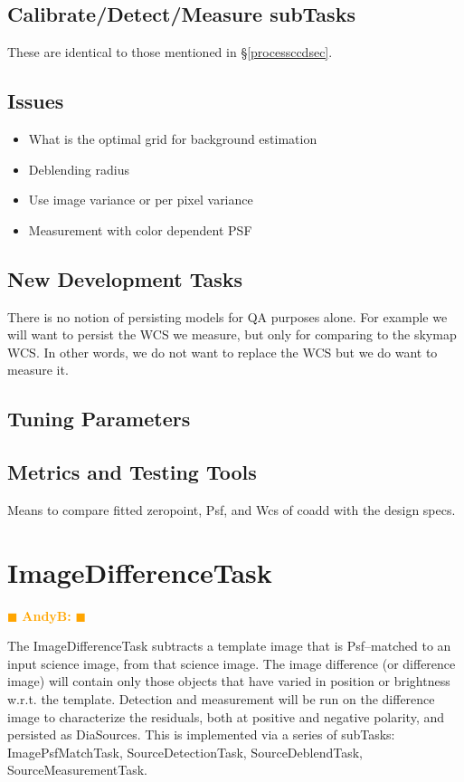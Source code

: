 \documentclass[12pt]{article}
\newcommand{\becker} { \textcolor{orange} {
\ensuremath{\blacksquare} {\bf AndyB:}  
\ensuremath{\blacksquare} } }
\begin{document}
\subsection{Calibrate/Detect/Measure subTasks}
These are identical to those mentioned in \S \ref{processccdsec}.

\subsection{Issues}
\begin{itemize}
\item What is the optimal grid for background estimation
\item Deblending radius
\item Use image variance or per pixel variance
\item Measurement with color dependent PSF
\end{itemize}

\subsection{New Development Tasks}
There is no notion of persisting models for QA purposes alone.  For example we will want to persist
the WCS we measure, but only for comparing to the skymap WCS.  In other words, we do not want to replace the 
WCS but we do want to measure it.

\subsection{Tuning Parameters}

\subsection{Metrics and Testing Tools}
Means to compare fitted zeropoint, Psf, and Wcs of coadd with the
design specs.


\clearpage 
\section{ImageDifferenceTask \label{sec-imagedifftask}} \becker

The ImageDifferenceTask subtracts a template image that is
Psf--matched to an input science image, from that science image.  The
image difference (or difference image) will contain only those objects
that have varied in position or brightness w.r.t. the template.
Detection and measurement will be run on the difference image to
characterize the residuals, both at positive and negative polarity,
and persisted as DiaSources.  This is implemented via a series of
subTasks: ImagePsfMatchTask, SourceDetectionTask, SourceDeblendTask,
SourceMeasurementTask.
\end{document}
